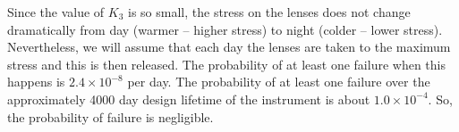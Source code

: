 \documentclass{article}
\newcommand{\unit}[1]{\ensuremath{\mathrm{#1}}}
\begin{document}
Since the value of $K_3$ is so small, the stress on the lenses does not change dramatically from day (warmer -- higher stress) to night (colder -- lower stress). Nevertheless, we will assume that each day the lenses are taken to the maximum stress and this is then released. The probability of at least one failure when this happens is $2.4\times10^{-8}$ per day. 
The probability of at least one failure over the approximately 4000 day design lifetime of the instrument is about $1.0\times10^{-4}$. So, the probability of failure is negligible.

%
%
%
%
%
\end{document}
